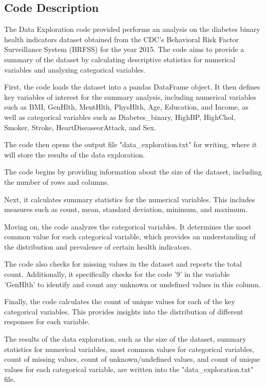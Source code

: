 \documentclass[11pt]{article}
\begin{document}
\subsection{Code Description}

The Data Exploration code provided performs an analysis on the diabetes binary health indicators dataset obtained from the CDC's Behavioral Risk Factor Surveillance System (BRFSS) for the year 2015. The code aims to provide a summary of the dataset by calculating descriptive statistics for numerical variables and analyzing categorical variables.

First, the code loads the dataset into a pandas DataFrame object. It then defines key variables of interest for the summary analysis, including numerical variables such as BMI, GenHlth, MentHlth, PhysHlth, Age, Education, and Income, as well as categorical variables such as Diabetes\_binary, HighBP, HighChol, Smoker, Stroke, HeartDiseaseorAttack, and Sex.

The code then opens the output file "data\_exploration.txt" for writing, where it will store the results of the data exploration. 

The code begins by providing information about the size of the dataset, including the number of rows and columns.

Next, it calculates summary statistics for the numerical variables. This includes measures such as count, mean, standard deviation, minimum, and maximum.

Moving on, the code analyzes the categorical variables. It determines the most common value for each categorical variable, which provides an understanding of the distribution and prevalence of certain health indicators.

The code also checks for missing values in the dataset and reports the total count. Additionally, it specifically checks for the code '9' in the variable 'GenHlth' to identify and count any unknown or undefined values in this column.

Finally, the code calculates the count of unique values for each of the key categorical variables. This provides insights into the distribution of different responses for each variable.

The results of the data exploration, such as the size of the dataset, summary statistics for numerical variables, most common values for categorical variables, count of missing values, count of unknown/undefined values, and count of unique values for each categorical variable, are written into the "data\_exploration.txt" file.
\end{document}
